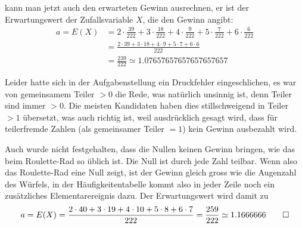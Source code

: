\begin{loesung}
\begin{teilaufgaben}
kann man jetzt auch den erwarteten Gewinn ausrechnen, er ist der
Erwartungswert der Zufallsvariable $X$, die den Gewinn angibt:
\begin{align*}
a=E(X)&=2\cdot \frac{39}{222}+3\cdot\frac{18}{222}+4\cdot\frac{9}{222}
+5\cdot\frac{7}{222}+6\cdot\frac6{222}
\\
&=\frac{
2\cdot 39+3\cdot 18+4\cdot 9+5\cdot 7 +6\cdot 6
}{222}
\\
&=\frac{ 239 }{222}
\simeq 1.07657657657657657657
\end{align*}
\end{teilaufgaben}
Leider hatte sich in der Aufgabenstellung ein Druckfehler eingeschlichen,
es war von gemeinsamem Teiler $> 0$ die Rede, was natürlich unsinnig ist,
denn Teiler sind immer $> 0$. Die meisten Kandidaten haben dies stillschweigend
in Teiler $>1$ übersetzt, was auch richtig ist, weil ausdrücklich
gesagt wird, dass für teilerfremde Zahlen (als gemeinsamer Teiler $= 1$)
kein Gewinn ausbezahlt wird.

Auch wurde nicht festgehalten,
dass die Nullen keinen Gewinn bringen, wie das beim Roulette-Rad so
üblich ist. Die Null ist durch jede Zahl teilbar. Wenn also das Roulette-Rad
eine Null zeigt, ist der Gewinn gleich gross wie die Augenzahl des Würfels,
in der Häufigkeitentabelle kommt also in jeder Zeile noch ein zusätzliches
Elementarereignis dazu. Der Erwartungswert wird damit zu
\[
a=E(X)=
\frac{2\cdot 40+3\cdot 19+4\cdot 10+5\cdot 8+6\cdot 7}{222}
=
\frac{259}{222}
\simeq
1.1666666
\qedhere
\]
\end{loesung}

